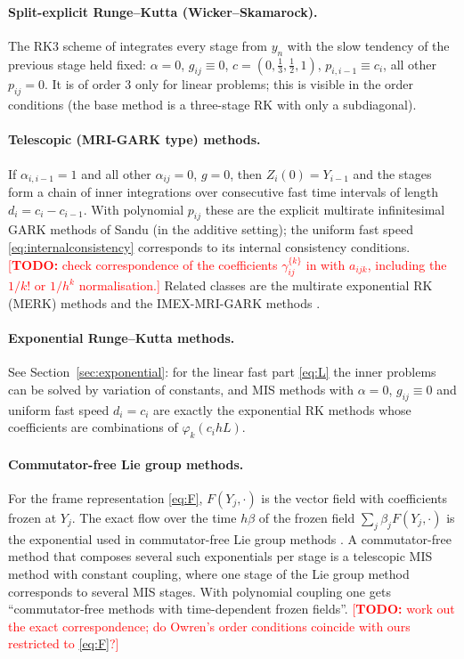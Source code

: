 \documentclass[11pt,a4paper]{article}
\theoremstyle{definition}
\theoremstyle{remark}
\newcommand{\todo}[1]{\textcolor{red}{[\textbf{TODO:} #1]}}
\begin{document}
\paragraph{Split-explicit Runge--Kutta (Wicker--Skamarock).}
The RK3 scheme of \cite{WickerSkamarock2002} integrates every stage from
$y_n$ with the slow tendency of the previous stage held fixed:
$\alpha=0$, $g_{ij}\equiv0$, $c=(0,\tfrac13,\tfrac12,1)$,
$p_{i,i-1}\equiv c_i$, all other $p_{ij}=0$. It is of order 3 only for
linear problems; this is visible in the order conditions (the base method
is a three-stage RK with only a subdiagonal).

\paragraph{Telescopic (MRI-GARK type) methods.}
If $\alpha_{i,i-1}=1$ and all other $\alpha_{ij}=0$, $g=0$, then
$Z_i(0)=Y_{i-1}$ and the stages form a chain of inner integrations over
consecutive fast time intervals of length $d_i=c_i-c_{i-1}$. With
polynomial $p_{ij}$ these are the explicit multirate infinitesimal GARK
methods of Sandu \cite{Sandu2019} (in the additive setting); the uniform
fast speed \eqref{eq:internalconsistency} corresponds to its internal
consistency conditions. \todo{check correspondence of the coefficients
$\gamma_{ij}^{\{k\}}$ in \cite{Sandu2019} with $a_{ijk}$, including the
$1/k!$ or $1/h^k$ normalisation.} Related classes are the multirate
exponential RK (MERK) methods \cite{LuanChinomonaReynolds2020} and the
IMEX-MRI-GARK methods \cite{ChinomonaReynolds2021}.

\paragraph{Exponential Runge--Kutta methods.}
See Section~\ref{sec:exponential}: for the linear fast part \eqref{eq:L}
the inner problems can be solved by variation of constants, and MIS
methods with $\alpha=0$, $g_{ij}\equiv0$ and uniform fast speed $d_i=c_i$ are
exactly the exponential RK methods whose coefficients are combinations of
$\varphi_k(c_ihL)$.

\paragraph{Commutator-free Lie group methods.}
For the frame representation \eqref{eq:F}, $F(Y_j,\cdot)$ is the vector
field with coefficients frozen at $Y_j$. The exact flow over the time
$h\beta$ of the frozen field $\sum_j\beta_jF(Y_j,\cdot)$ is the
exponential used in commutator-free Lie group methods
\cite{CelledoniMarthinsenOwren2003,Owren2006}. A commutator-free method
that composes several such exponentials per stage is a telescopic MIS
method with constant coupling, where one stage of the Lie group method
corresponds to several MIS stages. With polynomial coupling one gets
``commutator-free methods with time-dependent frozen fields''.
\todo{work out the exact correspondence; do Owren's order conditions
coincide with ours restricted to \eqref{eq:F}?}
\end{document}

